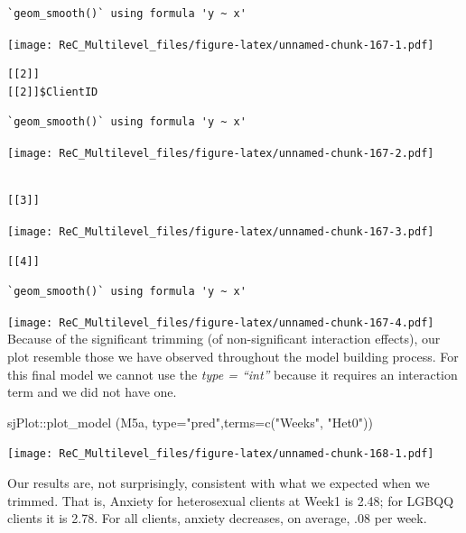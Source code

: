 \documentclass[
  11pt,
]{book}
\newenvironment{Shaded}{\begin{snugshade}}{\end{snugshade}}
\newcommand{\AttributeTok}[1]{\textcolor[rgb]{0.77,0.63,0.00}{#1}}
\newcommand{\FunctionTok}[1]{\textcolor[rgb]{0.00,0.00,0.00}{#1}}
\newcommand{\NormalTok}[1]{#1}
\newcommand{\SpecialCharTok}[1]{\textcolor[rgb]{0.00,0.00,0.00}{#1}}
\newcommand{\StringTok}[1]{\textcolor[rgb]{0.31,0.60,0.02}{#1}}
\begin{document}
\begin{verbatim}
`geom_smooth()` using formula 'y ~ x'
\end{verbatim}

\texttt{[image: ReC\_Multilevel\_files/figure-latex/unnamed-chunk-167-1.pdf]}

\begin{verbatim}
[[2]]
[[2]]$ClientID
\end{verbatim}

\begin{verbatim}
`geom_smooth()` using formula 'y ~ x'
\end{verbatim}

\texttt{[image: ReC\_Multilevel\_files/figure-latex/unnamed-chunk-167-2.pdf]}

\begin{verbatim}

[[3]]
\end{verbatim}

\texttt{[image: ReC\_Multilevel\_files/figure-latex/unnamed-chunk-167-3.pdf]}

\begin{verbatim}
[[4]]
\end{verbatim}

\begin{verbatim}
`geom_smooth()` using formula 'y ~ x'
\end{verbatim}

\texttt{[image: ReC\_Multilevel\_files/figure-latex/unnamed-chunk-167-4.pdf]}
Because of the significant trimming (of non-significant interaction effects), our plot resemble those we have observed throughout the model building process. For this final model we cannot use the \emph{type = ``int''} because it requires an interaction term and we did not have one.

\begin{Shaded}
\begin{Highlighting}[]
\NormalTok{sjPlot}\SpecialCharTok{::}\FunctionTok{plot\_model}\NormalTok{ (M5a, }\AttributeTok{type=}\StringTok{"pred"}\NormalTok{,}\AttributeTok{terms=}\FunctionTok{c}\NormalTok{(}\StringTok{"Weeks"}\NormalTok{, }\StringTok{"Het0"}\NormalTok{))}
\end{Highlighting}
\end{Shaded}

\texttt{[image: ReC\_Multilevel\_files/figure-latex/unnamed-chunk-168-1.pdf]}

Our results are, not surprisingly, consistent with what we expected when we trimmed. That is, Anxiety for heterosexual clients at Week1 is 2.48; for LGBQQ clients it is 2.78. For all clients, anxiety decreases, on average, .08 per week.
\end{document}
